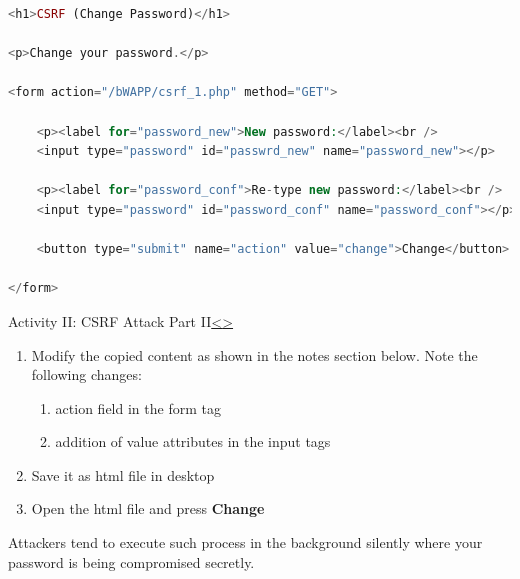 \documentclass[12pt]{extarticle}
\newenvironment{instructionblock}{\Large\bgroup}{\egroup}
\begin{document}
\begin{lstlisting}[basicstyle=\small, language=php, breaklines=true]
<h1>CSRF (Change Password)</h1>

<p>Change your password.</p>

<form action="/bWAPP/csrf_1.php" method="GET">

	<p><label for="password_new">New password:</label><br />
	<input type="password" id="passwrd_new" name="password_new"></p>

	<p><label for="password_conf">Re-type new password:</label><br />
	<input type="password" id="password_conf" name="password_conf"></p>  

	<button type="submit" name="action" value="change">Change</button>   

</form>
\end{lstlisting}




\pagebreak
\begin{slide}{Activity II: CSRF Attack Part II}{\hyperref[slide 15]{\textless}\hyperref[slide 17]{\textgreater}}
	\begin{instructionblock}
		
		\begin{enumerate}
			\item Modify the copied content as shown in the notes section below. Note the following changes:
			\begin{enumerate}
				\item action field in the form tag
				\item addition of value attributes in the input tags
			\end{enumerate}
			\item Save it as html file in desktop
			\item Open the html file and press \textbf{Change}
		\end{enumerate}
		Attackers tend to execute such process in the background silently where your password is being compromised secretly.
	\end{instructionblock}	
\end{slide}

\vspace{2mm}
\noindent 
\vfill
\end{document}
